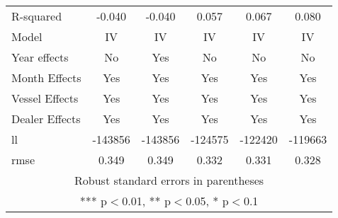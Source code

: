 \begin{tabular}{lccccc}
R-squared & -0.040 & -0.040 & 0.057 & 0.067 & 0.080 \\
Model & IV & IV & IV & IV & IV \\
Year effects & No & Yes & No & No & No \\
Month Effects & Yes & Yes & Yes & Yes & Yes \\
Vessel Effects & Yes & Yes & Yes & Yes & Yes \\
Dealer Effects & Yes & Yes & Yes & Yes & Yes \\
ll & -143856 & -143856 & -124575 & -122420 & -119663 \\
 rmse & 0.349 & 0.349 & 0.332 & 0.331 & 0.328 \\ \hline
\multicolumn{6}{c}{ Robust standard errors in parentheses} \\
\multicolumn{6}{c}{ *** p$<$0.01, ** p$<$0.05, * p$<$0.1} \\
\end{tabular}
